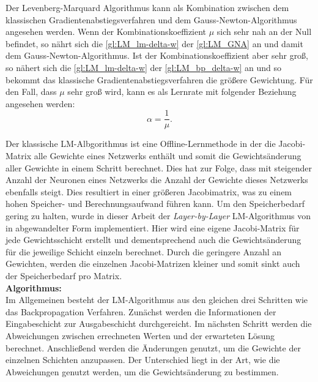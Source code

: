 Der Levenberg-Marquard Algorithmus kann als Kombination zwischen dem klassischen Gradientenabstiegsverfahren und dem Gauss-Newton-Algorithmus angesehen werden. Wenn der Kombinationskoeffizient $\mu$ sich sehr nah an der Null befindet, so nährt sich die \autoref{gl:LM_lm-delta-w} der \autoref{gl:LM_GNA} an und damit dem Gauss-Newton-Algorithmus. Ist der Kombinationskoeffizient aber sehr groß, so nähert sich die \autoref{gl:LM_lm-delta-w} der \autoref{gl:LM_bp_delta-w} an und so bekommt das klassische Gradientenabstiegsverfahren die größere Gewichtung. Für den Fall, dass $\mu$ sehr groß wird, kann es als Lernrate mit folgender Beziehung angesehen werden:\,
\begin{equation}
\alpha = \frac{1}{\mu}.
\label{gl:LM_lernrate}
\end{equation}

Der klassische LM-Albgorithmus ist eine Offline-Lernmethode in der die Jacobi-Matrix alle Gewichte eines Netzwerks enthält und somit die Gewichtsänderung aller Gewichte in einem Schritt berechnet. Dies hat zur Folge, dass mit steigender Anzahl der Neuronen eines Netzwerks die Anzahl der Gewichte dieses Netzwerks ebenfalls steigt. Dies resultiert in einer größeren Jacobimatrix, was zu einem hohen Speicher- und Berechnungsaufwand führen kann. Um den Speicherbedarf gering zu halten, wurde in dieser Arbeit der \textit{Layer-by-Layer} LM-Algorithmus von \citet{Kwak2012} in abgewandelter Form implementiert. Hier wird eine eigene Jacobi-Matrix für jede Gewichtsschicht erstellt und dementsprechend auch die Gewichtsänderung für die jeweilige Schicht einzeln berechnet. Durch die geringere Anzahl an Gewichten, werden die einzelnen Jacobi-Matrizen kleiner und somit sinkt auch der Speicherbedarf pro Matrix.\\

\textbf{Algorithmus:}\,\\
Im Allgemeinen besteht der LM-Algorithmus aus den gleichen drei Schritten wie das Backpropagation Verfahren. Zunächst werden die Informationen der Eingabeschicht zur Ausgabeschicht durchgereicht. Im nächsten Schritt werden die Abweichungen zwischen errechneten Werten und der erwarteten Lösung berechnet. Anschließend werden die Änderungen genutzt, um die Gewichte der einzelnen Schichten anzupassen. Der Unterschied liegt in der Art, wie die Abweichungen genutzt werden, um die Gewichtsänderung zu bestimmen.

